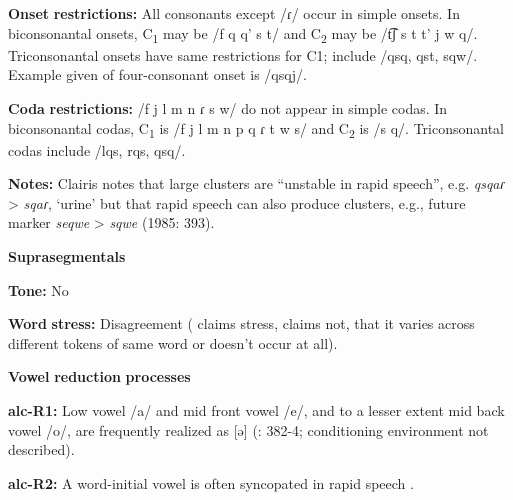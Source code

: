 \documentclass[output=paper]{langsci/langscibook}
\begin{document}
\begin{styleBody}
\textbf{Onset} \textbf{restrictions:} All consonants except /ɾ/ occur in simple onsets. In biconsonantal onsets, C\textsubscript{1} may be /f q q' s t/ and C\textsubscript{2} may be /t͡ʃ s t t' j w q/. Triconsonantal onsets have same restrictions for C1; include /qsq, qst, sqw/. Example given of four-consonant onset is /qsqj/.
\end{styleBody}

\begin{styleBody}
\textbf{Coda} \textbf{restrictions:} /f j l m n ɾ s w/ do not appear in simple codas. In biconsonantal codas, C\textsubscript{1} is /f j l m n p q ɾ t w s/ and C\textsubscript{2} is /s q/. Triconsonantal codas include /lqs, rqs, qsq/.
\end{styleBody}

\begin{styleBody}
\textbf{Notes:} Clairis notes that large clusters are “unstable in rapid speech”, e.g. \textit{qsqaɾ} > \textit{sqaɾ}, ‘urine’ but that rapid speech can also produce clusters, e.g., future marker \textit{seqwe} > \textit{sqwe} (1985: 393).
\end{styleBody}

\begin{styleBody}
\textbf{Suprasegmentals}
\end{styleBody}

\begin{styleBody}
\textbf{Tone:} No
\end{styleBody}

\begin{styleBody}
\textbf{Word} \textbf{stress:} Disagreement (\citealt{Clairis1977} claims stress, \citealt{Clairis1985} claims not, that it varies across different tokens of same word or doesn’t occur at all).
\end{styleBody}

\begin{styleBody}
\textbf{Vowel} \textbf{reduction} \textbf{processes}
\end{styleBody}

\begin{styleBody}
\textbf{alc-R1:} Low vowel /a/ and mid front vowel /e/, and to a lesser extent mid back vowel /o/, are frequently realized as [ə] (\citealt{Clairis1985}: 382-4; conditioning environment not described).
\end{styleBody}

\begin{styleBody}
\textbf{alc-R2:} A word-initial vowel is often syncopated in rapid speech \citep[393]{Clairis1985}.
\end{styleBody}
\end{document}
